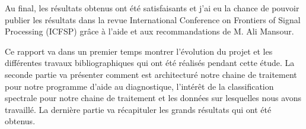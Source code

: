 Au final, les résultats obtenus ont été satisfaisants et j'ai eu la chance de pouvoir publier les résultats dans la revue International Conference on Frontiers of Signal Processing (ICFSP) grâce à l'aide et aux recommandations de M. Ali Mansour.

\medskip


Ce rapport va dans un premier temps montrer l'évolution du projet et les différentes travaux bibliographiques qui ont été réalisés pendant cette étude. La seconde partie va présenter comment est architecturé notre chaine de traitement pour notre programme d'aide au diagnostique, l'intérêt de la classification spectrale pour notre chaine de traitement et les données sur lesquelles nous avons travaillé. La dernière partie va récapituler les grands résultats qui ont été obtenus.

